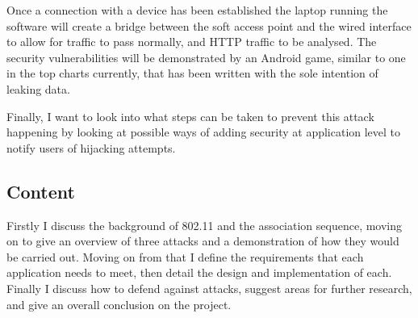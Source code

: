 Once a connection with a device has been established the laptop running the software will create a bridge between the soft access point and the wired interface to allow for traffic to pass normally, and HTTP traffic to be analysed. The security vulnerabilities will be demonstrated by an Android game, similar to one in the top charts currently, that has been written with the sole intention of leaking data. 

Finally, I want to look into what steps can be taken to prevent this attack happening by looking at possible ways of adding security at application level to notify users of hijacking attempts.

\subsection{Content}
Firstly I discuss the background of 802.11 and the association sequence, moving on to give an overview of three attacks and a demonstration of how they would be carried out. Moving on from that I define the requirements that each application needs to meet, then detail the design and implementation of each. Finally I discuss how to defend against attacks, suggest areas for further research, and give an overall conclusion on the project.
\clearpage